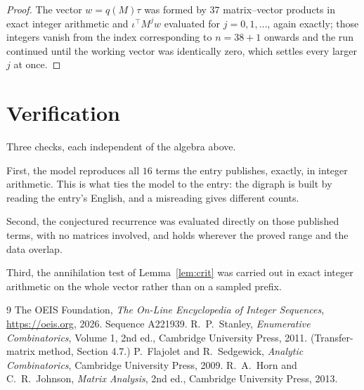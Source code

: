 \documentclass[11pt,a4paper]{article}
\theoremstyle{plain}
\theoremstyle{definition}
\begin{document}
\begin{proof}
The vector $w=q(M)\tau$ was formed by $37$ matrix--vector products in exact integer
arithmetic and $\iota^{\!\top}M^{j}w$ evaluated for $j=0,1,\dots$, again exactly; those
integers vanish from the index corresponding to $n=38+1$ onwards and the run continued
until the working vector was identically zero, which settles every larger $j$ at once.
\end{proof}

\section{Verification}

Three checks, each independent of the algebra above.

First, the model reproduces all $16$ terms the entry publishes, exactly, in integer
arithmetic. This is what ties the model to the entry: the digraph is built by reading the
entry's English, and a misreading gives different counts.

Second, the conjectured recurrence was evaluated directly on those published terms, with no
matrices involved, and holds wherever the proved range and the data overlap.

Third, the annihilation test of Lemma~\ref{lem:crit} was carried out in exact integer
arithmetic on the whole vector rather than on a sampled prefix.

\begin{thebibliography}{9}
 The OEIS Foundation, \emph{The On-Line Encyclopedia of Integer
Sequences}, \url{https://oeis.org}, 2026. Sequence A221939.
 R.~P.~Stanley, \emph{Enumerative Combinatorics}, Volume 1, 2nd ed.,
Cambridge University Press, 2011. (Transfer-matrix method, Section 4.7.)
 P.~Flajolet and R.~Sedgewick, \emph{Analytic Combinatorics}, Cambridge
University Press, 2009.
 R.~A.~Horn and C.~R.~Johnson, \emph{Matrix Analysis}, 2nd ed., Cambridge
University Press, 2013.
\end{thebibliography}
\end{document}
